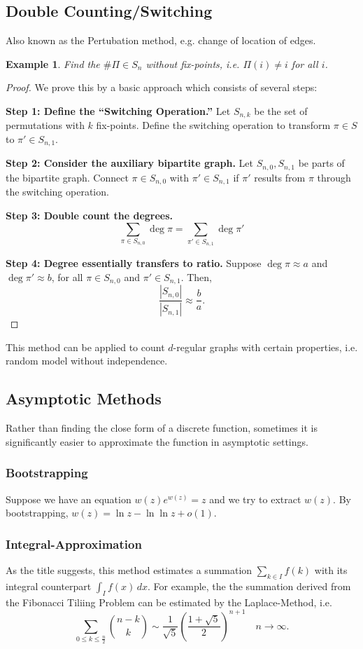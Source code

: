 \documentclass[a4paper]{article}
\newtheorem{example}[theorem]{Example}
\begin{document}
\subsection*{Double Counting/Switching}

Also known as the Pertubation method, e.g. change of location of edges.

\begin{example}
  Find the $\# \Pi \in S_n$ without fix-points, i.e. $\Pi(i) \neq i$ for all $i$.
\end{example}

\begin{proof}
  We prove this by a basic approach which consists of several steps:

  \textbf{Step 1: Define the ``Switching Operation.''} Let $S_{n, k}$ be the set of permutations with $k$ fix-points. Define the switching operation to transform $\pi \in S$ to $\pi' \in S_{n, 1}$.

  \textbf{Step 2: Consider the auxiliary bipartite graph.} Let $S_{n, 0}, S_{n, 1}$ be parts of the bipartite graph. Connect $\pi \in S_{n, 0}$ with $\pi' \in S_{n, 1}$ if $\pi'$ results from $\pi$ through the switching operation.

  \textbf{Step 3: Double count the degrees.}
  \[
    \sum_{\pi \in S_{n, 0}} \deg \pi = \sum_{\pi' \in S_{n, 1}} \deg \pi'
  \]

  \textbf{Step 4: Degree essentially transfers to ratio.} Suppose $\deg \pi \approx a$ and $\deg \pi' \approx b$, for all $\pi \in S_{n, 0}$ and $\pi' \in S_{n, 1}$. Then,
  \[
    \frac{|S_{n, 0}|}{|S_{n, 1}|} \approx \frac{b}{a}.
  \]
\end{proof}

This method can be applied to count $d$-regular graphs with certain properties, i.e. random model without independence.

\subsection*{Asymptotic Methods}

Rather than finding the close form of a discrete function, sometimes it is significantly easier to approximate the function in asymptotic settings.

\subsubsection*{Bootstrapping}

Suppose we have an equation $w(z)e^{w(z)} = z$ and we try to extract $w(z)$. By bootstrapping, $w(z) = \ln z - \ln \ln z + o(1)$.

\subsubsection*{Integral-Approximation}

As the title suggests, this method estimates a summation $\sum_{k \in I} f(k)$ with its integral counterpart $\int_I f(x) \, dx$. For example, the the summation derived from the Fibonacci Tiliing Problem can be estimated by the Laplace-Method, i.e.
\[
  \sum_{0 \leq k \leq \frac{n}{2}} \binom{n - k}{k} \sim \frac{1}{\sqrt{5}}\left(\frac{1 + \sqrt{5}}{2}\right)^{n + 1} \quad n \to \infty.
\]
\end{document}
